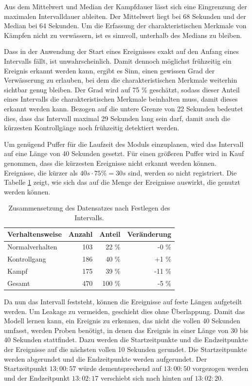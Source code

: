Aus dem Mittelwert und Median der Kampfdauer lässt sich eine Eingrenzung der maximalen Intervalldauer ableiten. Der Mittelwert liegt bei 68 Sekunden und der Median bei 64 Sekunden. Um die Erfassung der charakteristischen Merkmale von Kämpfen nicht zu verwässern, ist es sinnvoll, unterhalb des Medians zu bleiben. \par

Dass in der Anwendung der Start eines Ereignisses exakt auf den Anfang eines Intervalls fällt, ist unwahrscheinlich. Damit dennoch möglichst frühzeitig ein Ereignis erkannt werden kann,  ergibt es Sinn, einen gewissen Grad der Verwässerung zu erlauben, bei dem die charakteristischen Merkmale weiterhin sichtbar genug bleiben. Der Grad wird auf 75 \% geschätzt, sodass dieser Anteil eines Intervalls die charakteristischen Merkmale beinhalten muss, damit dieses erkannt werden kann. Bezogen auf die untere Grenze von 22 Sekunden bedeutet dies, dass das Intervall maximal 29 Sekunden lang sein darf, damit auch die kürzesten Kontrollgänge noch frühzeitig detektiert werden. \par

Um genügend Puffer für die Laufzeit des Moduls einzuplanen, wird das Intervall auf eine Länge von 40 Sekunden gesetzt. Für einen größeren Puffer wird in Kauf genommen, dass die kürzesten Ereignisse nicht erkannt werden können. Ereignisse, die kürzer als \(40 s \cdot 75 \% = 30 s\) sind, werden so nicht registriert. Die Tabelle \ref{tab:DataNachIntervall} zeigt, wie sich das auf die Menge der Ereignisse auswirkt, die genutzt werden können.\par

\begin{table}[ht]
    \centering
    \caption{Zusammensetzung des Datensatzes nach Festlegen des Intervalls.}
    \begin{tabular}{|l|r|r|r|}
    \hline
        Verhaltensweise & Anzahl & Anteil & Veränderung\\
    \hline
        Normalverhalten & 103 & 22 \% & -0 \%\\
        Kontrollgang & 186 & 40 \% & +1 \%\\
        Kampf & 175 & 39 \% & -11 \%\\
    \hline
    \hline
        Gesamt & 470 & 100 \% & -5 \% \\
    \hline
    \end{tabular}
    \label{tab:DataNachIntervall}
\end{table}

Da nun das Intervall feststeht, können die Ereignisse auf feste Längen aufgeteilt werden. Um \gls{Leakage} zu vermeiden, geschieht dies ohne Überlappung. Damit das Modell lernen kann, ein Ereignis zu erkennen, das nicht die vollen 40 Sekunden umfasst, werden Proben benötigt, in denen das Ereignis in einer Länge von 30 bis 40 Sekunden stattfindet. Dazu werden die Startzeitpunkte und die Endzeitpunkte der Ereignisse auf die nächsten vollen 10 Sekunden gerundet. Die Startzeitpunkte werden abgerundet und die Endzeitpunkte werden aufgerundet. Der Startzeitpunkt \(13:00:57\) würde dementsprechend auf \(13:00:50\) vorgezogen werden und der Endzeitpunkt \(13:02:17\) verschiebt sich nach hinten auf \(13:02:20\). \par

